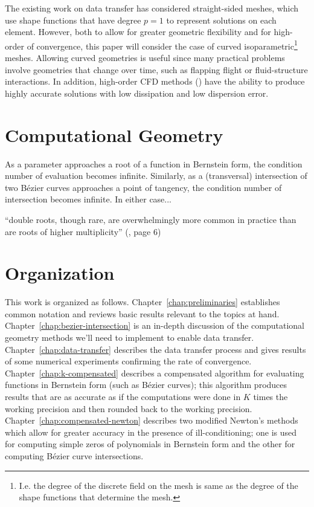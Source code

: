 The existing work on data transfer has considered straight-sided meshes,
which use shape functions that have degree \(p = 1\) to represent solutions
on each element. However, both to allow for greater geometric flexibility
and for high-order of convergence, this paper will consider the case
of curved isoparametric\footnote{I.e. the degree of the discrete field on the
mesh is same as the degree of the shape functions that determine the
mesh.} meshes. Allowing curved geometries is useful since many practical
problems involve geometries that change over time, such as flapping flight
or fluid-structure interactions. In addition, high-order CFD methods
(\cite{Wang2013}) have the ability to produce highly accurate solutions
with low dissipation and low dispersion error.

\section{Computational Geometry}

As a parameter approaches a root of a function in Bernstein form,
the condition number of evaluation becomes infinite. Similarly,
as a (transversal) intersection of two B\'{e}zier curves approaches a
point of tangency, the condition number of intersection becomes
infinite. In either case...

``double roots, though rare, are overwhelmingly more common in practice
than are roots of higher multiplicity'' (\cite{Kahan1972}, page 6)

\section{Organization}

This work is organized as follows. Chapter~\ref{chap:preliminaries}
establishes common notation and reviews basic results relevant to the
topics at hand. Chapter~\ref{chap:bezier-intersection} is an
in-depth discussion of the computational geometry methods we'll need
to implement to enable data transfer. Chapter~\ref{chap:data-transfer}
describes the data transfer process and gives results of some
numerical experiments confirming the rate of convergence.
Chapter~\ref{chap:k-compensated} describes a compensated algorithm for
evaluating functions in Bernstein form (such as B\'{e}zier curves);
this algorithm produces results that are as accurate as if
the computations were done in \(K\) times the working precision
and then rounded back to the working precision.
Chapter~\ref{chap:compensated-newton} describes two modified Newton's
methods which allow for greater accuracy in the presence of
ill-conditioning; one is used for computing simple zeros
of polynomials in Bernstein form and the other for computing
B\'{e}zier curve intersections.
